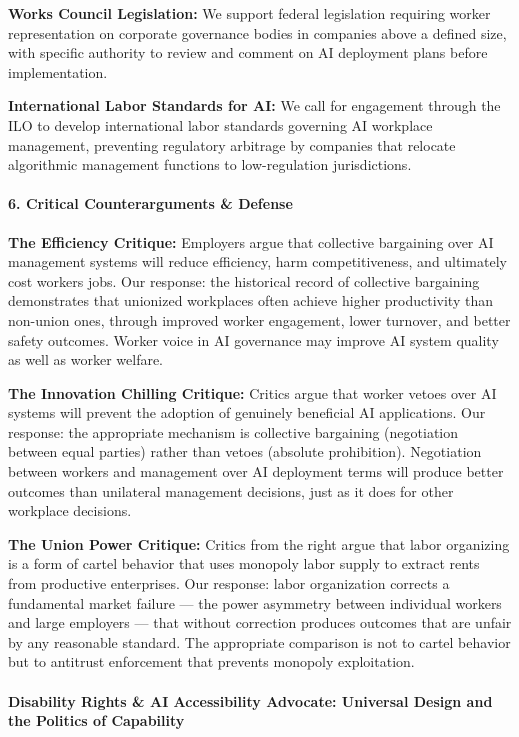 \textbf{Works Council Legislation:} We support federal legislation
requiring worker representation on corporate governance bodies in
companies above a defined size, with specific authority to review and
comment on AI deployment plans before implementation.

\textbf{International Labor Standards for AI:} We call for engagement
through the ILO to develop international labor standards governing AI
workplace management, preventing regulatory arbitrage by companies that
relocate algorithmic management functions to low-regulation
jurisdictions.

\paragraph{6. Critical Counterarguments \&
Defense}\label{critical-counterarguments-defense-39}

\textbf{The Efficiency Critique:} Employers argue that collective
bargaining over AI management systems will reduce efficiency, harm
competitiveness, and ultimately cost workers jobs. Our response: the
historical record of collective bargaining demonstrates that unionized
workplaces often achieve higher productivity than non-union ones,
through improved worker engagement, lower turnover, and better safety
outcomes. Worker voice in AI governance may improve AI system quality as
well as worker welfare.

\textbf{The Innovation Chilling Critique:} Critics argue that worker
vetoes over AI systems will prevent the adoption of genuinely beneficial
AI applications. Our response: the appropriate mechanism is collective
bargaining (negotiation between equal parties) rather than vetoes
(absolute prohibition). Negotiation between workers and management over
AI deployment terms will produce better outcomes than unilateral
management decisions, just as it does for other workplace decisions.

\textbf{The Union Power Critique:} Critics from the right argue that
labor organizing is a form of cartel behavior that uses monopoly labor
supply to extract rents from productive enterprises. Our response: labor
organization corrects a fundamental market failure --- the power
asymmetry between individual workers and large employers --- that
without correction produces outcomes that are unfair by any reasonable
standard. The appropriate comparison is not to cartel behavior but to
antitrust enforcement that prevents monopoly exploitation.

\paragraph{Disability Rights \& AI Accessibility Advocate: Universal
Design and the Politics of
Capability}\label{disability-rights-ai-accessibility-advocate-universal-design-and-the-politics-of-capability}

